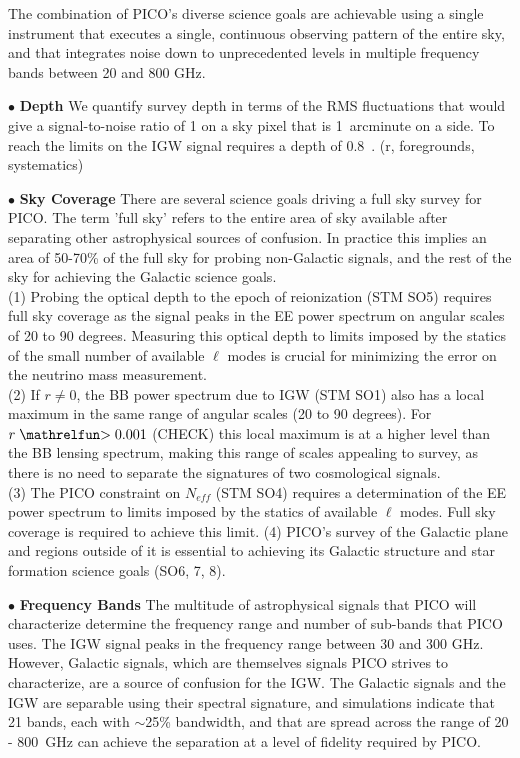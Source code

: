 \documentclass[PICOReport.tex]{subfiles}
\begin{document}
The combination of PICO's diverse science goals are achievable using a single instrument that executes 
a single, continuous observing pattern of the entire sky, and that integrates noise down to unprecedented levels in 
multiple frequency bands between 20 and 800 GHz. 

$\bullet$ {\bf Depth} \hspace{0.1in} We quantify survey depth in terms of the RMS fluctuations that would give
a signal-to-noise ratio of 1 on a sky pixel that is 1~arcminute on a side. To reach the limits on the IGW signal 
requires a depth of 0.8~\microkamin.  
 (r, foregrounds, systematics)

$\bullet$ {\bf Sky Coverage} \hspace{0.1in} There are several science goals driving a full sky survey for PICO. The 
term 'full sky' refers to the entire area of sky available after separating other astrophysical sources of confusion. In 
practice this implies an area of 50-70\% of the full sky for probing non-Galactic signals, and the rest of the sky
for achieving the Galactic science goals. \\
(1) Probing the optical depth to the epoch of reionization (STM SO5) requires full sky 
coverage as the signal peaks in the EE power spectrum on angular scales of 20 to 90 degrees. Measuring 
this optical depth to limits imposed by the statics of the small number of available $\ell$ modes is crucial 
for minimizing the error on the neutrino mass measurement. \\   
(2) If $r \ne 0 $, the BB power spectrum due to IGW (STM SO1) also has a local maximum in the same
range of angular scales (20 to 90 degrees). For $r \simgt 0.001$ (CHECK)
this local maximum is at a higher level than the BB lensing spectrum, making this range of scales appealing 
to survey, as there is no need to separate the signatures of two cosmological signals. \\
(3) The PICO constraint on $N_{eff}$ (STM SO4) requires a determination of the EE power spectrum to limits
imposed by the statics of available $\ell$ modes. Full sky coverage is required to achieve this limit.  
(4) PICO's survey of the Galactic plane and regions outside of it is essential to achieving its Galactic structure 
and star formation science goals (SO6, 7, 8). 

$\bullet$ {\bf Frequency Bands} \hspace{0.1in} The multitude of astrophysical signals that PICO will characterize determine
the frequency range and number of sub-bands that PICO uses. The IGW signal peaks 
in the frequency range between 30 and 300 GHz. However, Galactic signals, which are themselves signals PICO strives to 
characterize, are a source of confusion for the IGW. The Galactic signals and the IGW are separable using their 
spectral signature, and simulations indicate that 21 bands, each with $\sim$25\% bandwidth, and that are spread across 
the range of 20 - 800~GHz can achieve the separation at a level of fidelity required by PICO. 
\end{document}
